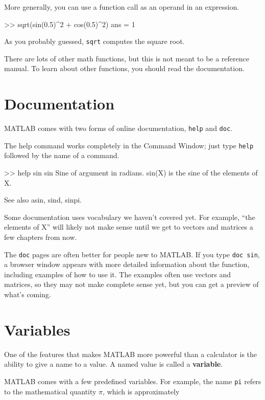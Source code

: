 \documentclass[
]{book}
\numberwithin{Answer}{chapter}
\numberwithin{Exercise}{chapter}
\begin{document}
More generally, you can use a function call as an operand in an expression.

\begin{code}
>> sqrt(sin(0.5)^2 + cos(0.5)^2)
ans = 1
\end{code}

As you probably guessed, {\tt sqrt} computes the square root.

There are lots of other math functions, but this is not meant to
be a reference manual.  To learn about other functions, you should
read the documentation.


\section{Documentation}

MATLAB comes with two forms of online documentation, {\tt help}
and {\tt doc}.

The help command works completely in the Command Window; just 
type {\tt help} followed by the name of a command.

\begin{code}
>> help sin
 sin    Sine of argument in radians.
    sin(X) is the sine of the elements of X.
 
    See also asin, sind, sinpi.
\end{code}

Some documentation uses vocabulary we haven't covered yet.  
For example, ``the elements of X'' will likely not make sense until
we get to vectors and matrices a few chapters from now.

The {\tt doc} pages are often better for people new to MATLAB.  
If you type {\tt doc sin}, a browser window appears with more detailed information about the function, including examples of how to use it.  The examples often
use vectors and matrices, so they may not make complete sense yet, 
but you can get a preview of what's coming.


\section{Variables}

One of the features that makes MATLAB more powerful than a calculator
is the ability to give a name to a value.  A named value is called
a {\bf variable}.

MATLAB comes with a few predefined variables.  For
example, the name {\tt pi} refers to the
mathematical quantity $\pi$, which is approximately
\end{document}
